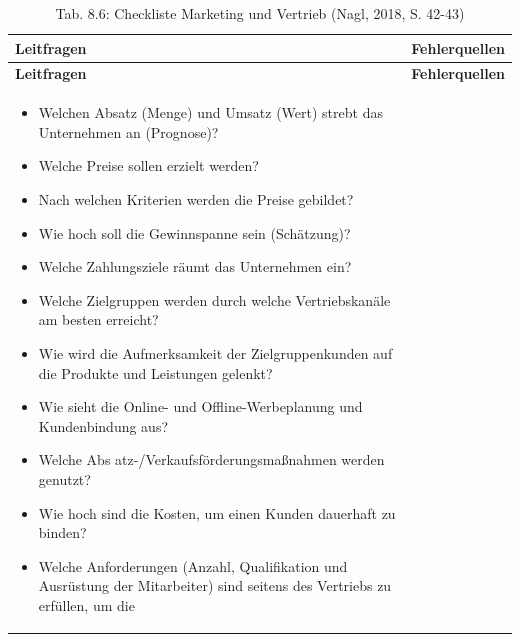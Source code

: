 \documentclass[
  letterpaper,
]{book}
\begin{document}
\begin{longtable}[]{@{}
  >{\raggedright\arraybackslash}p{}
  >{\raggedright\arraybackslash}p{}@{}}
\caption{Tab. 8.6: Checkliste Marketing und Vertrieb (Nagl, 2018, S.
42-43)}\tabularnewline
\toprule\noalign{}
\begin{minipage}[b]{\linewidth}\raggedright
\textbf{Leitfragen}
\end{minipage} & \begin{minipage}[b]{\linewidth}\raggedright
\textbf{Fehlerquellen}
\end{minipage} \\
\midrule\noalign{}
\endfirsthead
\toprule\noalign{}
\begin{minipage}[b]{\linewidth}\raggedright
\textbf{Leitfragen}
\end{minipage} & \begin{minipage}[b]{\linewidth}\raggedright
\textbf{Fehlerquellen}
\end{minipage} \\
\midrule\noalign{}
\endhead
\bottomrule\noalign{}
\endlastfoot
\begin{minipage}[t]{\linewidth}\raggedright
\begin{itemize}
\item
  Welchen Absatz (Menge) und Umsatz (Wert) strebt das Unternehmen an
  (Prognose)?
\item
  Welche Preise sollen erzielt werden?
\item
  Nach welchen Kriterien werden die Preise gebildet?
\item
  Wie hoch soll die Gewinnspanne sein (Schätzung)?
\item
  Welche Zahlungsziele räumt das Unternehmen ein?
\item
  Welche Zielgruppen werden durch welche Vertriebskanäle am besten
  erreicht?
\item
  Wie wird die Aufmerksamkeit der Zielgruppenkunden auf die Produkte und
  Leistungen gelenkt?
\item
  Wie sieht die Online- und Offline-Werbeplanung und Kundenbindung aus?
\item
  Welche Abs atz-/Verkaufsförderungsmaßnahmen werden genutzt?
\item
  Wie hoch sind die Kosten, um einen Kunden dauerhaft zu binden?
\item
  Welche Anforderungen (Anzahl, Qualifikation und Ausrüstung der
  Mitarbeiter) sind seitens des Vertriebs zu erfüllen, um die

\end{itemize}
\end{minipage}
\end{longtable}
\end{document}
